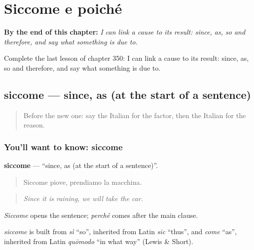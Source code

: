 
\chapter{Siccome e poiché}
\label{ch:it-siccome-e-poiche}

\begin{chapteropening}
\textbf{By the end of this chapter:} \emph{I can link a cause to its result: since, as, so and therefore, and say what something is due to.}

Complete the last lesson of chapter 350: I can link a cause to its result: since, as, so and therefore, and say what something is due to.
\end{chapteropening}

\section[siccome]{siccome — since, as (at the start of a sentence)}

\label{lesson:IT-C350-siccome}



\begin{quote}
Before the new one: say the Italian for the factor, then the Italian for the reason.
\end{quote}

\subsection*{You'll want to know: siccome}
\textbf{siccome} — \textquotedblleft{}since, as (at the start of a sentence)\textquotedblright{}.

\begin{quote}
Siccome piove, prendiamo la macchina.
\end{quote}

\begin{quote}
\emph{Since it is raining, we will take the car.}
\end{quote}

\emph{Siccome} opens the sentence; \emph{perché} comes after the main clause.

\begin{cousinweb}
\emph{siccome} is built from \emph{sì} \textquotedblleft{}so\textquotedblright{}, inherited from Latin \emph{sīc} \textquotedblleft{}thus\textquotedblright{}, and \emph{come} \textquotedblleft{}as\textquotedblright{}, inherited from Latin \emph{quōmodo} \textquotedblleft{}in what way\textquotedblright{} (Lewis \& Short).
\end{cousinweb}

